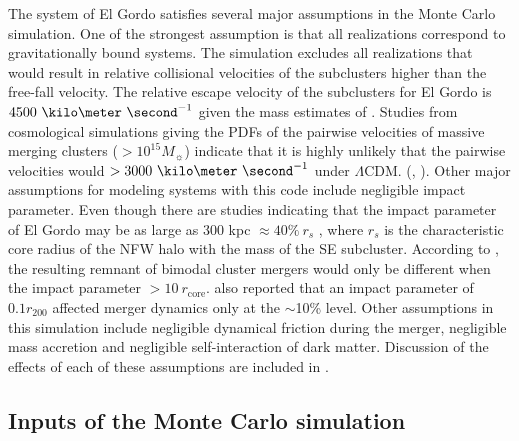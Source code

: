 The system of El Gordo satisfies several major assumptions in the Monte Carlo
simulation.
One of the strongest assumption is that all realizations correspond to
gravitationally bound systems. The simulation excludes all realizations
that would result in relative collisional velocities of the subclusters
higher than the free-fall velocity. The relative escape velocity of the
subclusters for El Gordo is $4500~\kilo\meter~\second^{-1}$ given
the mass estimates of \cite{Jee13} .  
Studies from cosmological simulations giving the PDFs of the pairwise velocities of massive merging clusters ($>
10^{15} M_{\sun}$) indicate that it is highly unlikely that the pairwise
velocities would $> 3000~\kilo \meter~\second^{-1}$ under $\Lambda$CDM.
(\citealt{Thompson12}, \citealt{Lee2010}).  Other major assumptions for
modeling systems with this code include negligible impact parameter. Even
though there are studies indicating that the impact parameter of El Gordo
may be as large as $300$ kpc $ \approx 40\%~r_s$ \citep{Molnar14},
where $r_s$ is the characteristic core
radius of the NFW halo with the mass of the SE subcluster. According to
\cite{Ricker98}, the resulting remnant of bimodal cluster mergers would only be
different when the impact parameter $> 10~ r_{\text{core}}$.
\cite{Mastropietro2008a} also reported that an impact parameter of $0.1
r_{200}$ affected merger dynamics only at the $\sim$10\% level.   
Other assumptions in this simulation include negligible dynamical friction
during the merger, negligible mass accretion and negligible self-interaction
of dark matter. Discussion of the effects of each of these assumptions are
included in .  
\par

\subsection{Inputs of the Monte Carlo simulation} \label{sec: inputs}
\setcounter{table}{0} 




